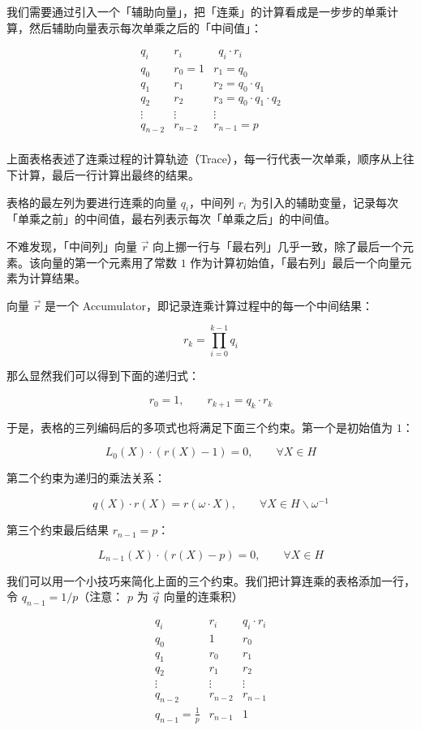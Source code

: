 我们需要通过引入一个「辅助向量」，把「连乘」的计算看成是一步步的单乘计算，然后辅助向量表示每次单乘之后的「中间值」：

\[
\begin{array}{c|c|l}
q_i & r_i & \ \ q_i\cdot r_i \\
\hline
q_0 & r_0=1  & r_1=q_0\\
q_1 & r_1 & r_2=q_0\cdot q_1\\
q_2 & r_2 & r_3=q_0\cdot q_1\cdot q_2\\
\vdots & \vdots & \vdots\\
q_{n-2} & r_{n-2} & r_{n-1} = p\\
\end{array}
\]

上面表格表述了连乘过程的计算轨迹（Trace），每一行代表一次单乘，顺序从上往下计算，最后一行计算出最终的结果。

表格的最左列为要进行连乘的向量 \({q_i}\)，中间列 \({r_i}\)
为引入的辅助变量，记录每次「单乘之前」的中间值，最右列表示每次「单乘之后」的中间值。

不难发现，「中间列」向量 \(\vec{r}\)
向上挪一行与「最右列」几乎一致，除了最后一个元素。该向量的第一个元素用了常数
\(1\) 作为计算初始值，「最右列」最后一个向量元素为计算结果。

向量 \(\vec{r}\) 是一个
Accumulator，即记录连乘计算过程中的每一个中间结果：

\[
r_k = \prod_{i=0}^{k-1}q_i
\]

那么显然我们可以得到下面的递归式：

\[
r_0 = 1, \qquad r_{k+1}=q_{k}\cdot r_{k}
\]

于是，表格的三列编码后的多项式也将满足下面三个约束。第一个是初始值为
\(1\)：

\[
L_0(X)\cdot(r(X)-1)=0, \qquad \forall X\in H 
\]

第二个约束为递归的乘法关系：

\[
q(X)\cdot r(X) = r(\omega\cdot X), \qquad \forall X\in H\backslash{\omega^{-1}}
\]

第三个约束最后结果 \(r_{n-1}=p\)：

\[
L_{n-1}(X)\cdot(r(X)-p)=0, \qquad \forall X\in H
\]

我们可以用一个小技巧来简化上面的三个约束。我们把计算连乘的表格添加一行，令
\(q_{n-1}=1/p\)（注意： \(p\) 为 \(\vec{q}\) 向量的连乘积）

\[
\begin{array}{c|c|c}
q_i & r_i & q_i\cdot r_i \\
\hline
q_0 & 1  & r_0\\
q_1 & r_0 & r_1\\
q_2 & r_1 & r_2\\
\vdots & \vdots & \vdots\\
q_{n-2} & r_{n-2} & r_{n-1}\\
q_{n-1}=\frac{1}{p} & r_{n-1} & 1 \\
\end{array}
\]

